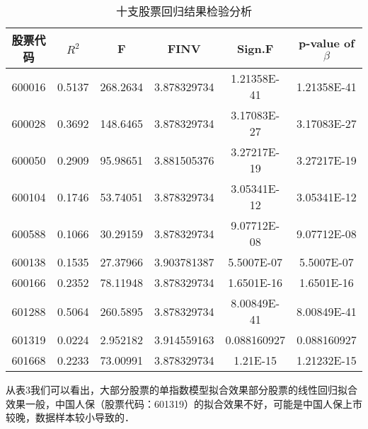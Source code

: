\begin{table}[ht]
\centering
\caption{十支股票回归结果检验分析}\label{inv9_tab3}
\begin{tabular}{|c|c|c|c|c|c|}
\hline
股票代码 & $R^{2}$ & F & FINV& Sign.F & p-value of $\beta$\\
\hline
600016 & 0.5137 & 268.2634 & 3.878329734& 1.21358E-41 & 1.21358E-41\\
\hline
600028 & 0.3692 & 148.6465 & 3.878329734 & 3.17083E-27 & 3.17083E-27\\
\hline
600050 & 0.2909 & 95.98651 &3.881505376& 3.27217E-19 & 3.27217E-19\\
\hline
600104 & 0.1746 & 53.74051 &3.878329734& 3.05341E-12 & 3.05341E-12\\
\hline
600588 & 0.1066 & 30.29159 &3.878329734& 9.07712E-08 & 9.07712E-08\\
\hline
600138 & 0.1535 & 27.37966 &3.903781387& 5.5007E-07 & 5.5007E-07\\
\hline
600166 & 0.2352 & 78.11948 &3.878329734& 1.6501E-16 & 1.6501E-16\\
\hline
601288 & 0.5064 & 260.5895 & 3.878329734&8.00849E-41 & 8.00849E-41\\
\hline
601319 & 0.0224 & 2.952182 &3.914559163& 0.088160927 & 0.088160927\\
\hline
601668 & 0.2233 & 73.00991 &3.878329734 & 1.21E-15 & 1.21232E-15\\
\hline
\end{tabular}
\end{table}

从表3我们可以看出，大部分股票的单指数模型拟合效果部分股票的线性回归拟合效果一般，中国人保（股票代码：601319）的拟合效果不好，可能是中国人保上市较晚，数据样本较小导致的．










